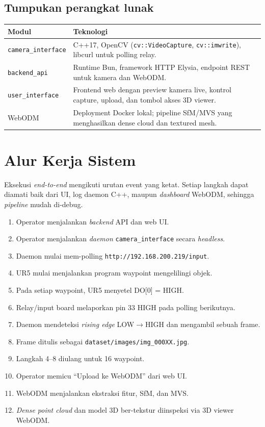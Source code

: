 \documentclass[11pt,a4paper]{article}
\newcommand{\code}[1]{\colorbox{bgcode}{\texttt{\small #1}}}
\begin{document}
\subsection{Tumpukan perangkat lunak}

\begin{tabularx}{\linewidth}{@{}p{4.2cm}X@{}}
    \toprule
    \textbf{Modul} & \textbf{Teknologi} \\
    \midrule
    \texttt{camera\_interface} & C++17, OpenCV (\code{cv::VideoCapture}, \code{cv::imwrite}), libcurl untuk polling relay. \\
    \texttt{backend\_api}      & Runtime Bun, framework HTTP Elysia, endpoint REST untuk kamera dan WebODM. \\
    \texttt{user\_interface}   & Frontend web dengan preview kamera live, kontrol capture, upload, dan tombol akses 3D viewer. \\
    WebODM                     & Deployment Docker lokal; pipeline SfM/MVS yang menghasilkan dense cloud dan textured mesh. \\
    \bottomrule
\end{tabularx}

\section{Alur Kerja Sistem}

Eksekusi \textit{end-to-end} mengikuti urutan event yang ketat. Setiap langkah dapat diamati baik dari UI, log daemon C++, maupun \textit{dashboard} WebODM, sehingga \textit{pipeline} mudah di-debug.

\begin{enumerate}[leftmargin=1.6em,itemsep=1pt]
    \item Operator menjalankan \textit{backend} API dan web UI.
    \item Operator menjalankan \textit{daemon} \texttt{camera\_interface} secara \textit{headless}.
    \item Daemon mulai mem-polling \code{http://192.168.200.219/input}.
    \item UR5 mulai menjalankan program waypoint mengelilingi objek.
    \item Pada setiap waypoint, UR5 menyetel DO[0] = HIGH.
    \item Relay/input board melaporkan pin 33 HIGH pada polling berikutnya.
    \item Daemon mendeteksi \textit{rising edge} LOW$\to$HIGH dan mengambil sebuah frame.
    \item Frame ditulis sebagai \code{dataset/images/img\_000XX.jpg}.
    \item Langkah 4--8 diulang untuk 16 waypoint.
    \item Operator memicu ``Upload ke WebODM'' dari web UI.
    \item WebODM menjalankan ekstraksi fitur, SfM, dan MVS.
    \item \textit{Dense point cloud} dan model 3D ber-tekstur diinspeksi via 3D viewer WebODM.
\end{enumerate}
\end{document}
